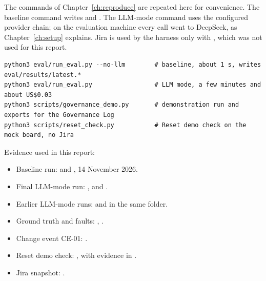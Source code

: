 The commands of Chapter~\ref{ch:reproduce} are repeated here for convenience. The baseline command writes  and . The LLM-mode command uses the configured provider chain; on the evaluation machine every call went to DeepSeek, as Chapter~\ref{ch:setup} explains. Jira is used by the harness only with , which was not used for this report.

\begin{lstlisting}[numbers=none]
python3 eval/run_eval.py --no-llm        # baseline, about 1 s, writes eval/results/latest.*
python3 eval/run_eval.py                 # LLM mode, a few minutes and about US$0.03
python3 scripts/governance_demo.py       # demonstration run and exports for the Governance Log
python3 scripts/reset_check.py           # Reset demo check on the mock board, no Jira
\end{lstlisting}

\noindent Evidence used in this report:
\begin{itemize}
  \item Baseline run:  and , 14 November 2026.
  \item Final LLM-mode run: ,  and .
  \item Earlier LLM-mode runs:  and  in the same folder.
  \item Ground truth and faults: , .
  \item Change event CE-01: .
  \item Reset demo check: , with evidence in .
  \item Jira snapshot: .
\end{itemize}
